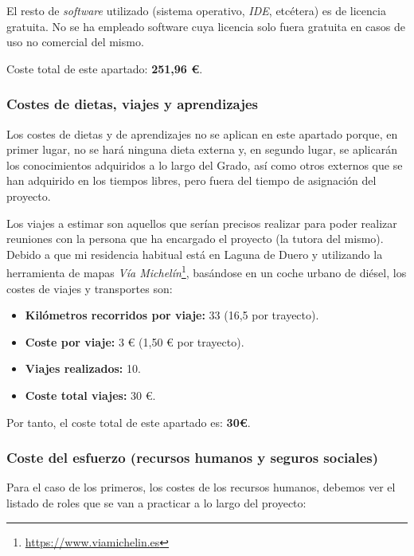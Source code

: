 \documentclass[twoside]{report}
\begin{document}
El resto de \textit{software} utilizado (sistema operativo, \textit{IDE}, etcétera) es de licencia gratuita. No se ha empleado software cuya licencia solo fuera gratuita en casos de uso no comercial del mismo.

Coste total de este apartado: \textbf{251,96 \euro}.

\subsubsection{Costes de dietas, viajes y aprendizajes}

Los costes de dietas y de aprendizajes no se aplican en este apartado porque, en primer lugar, no se hará ninguna dieta externa y, en segundo lugar, se aplicarán los conocimientos adquiridos a lo largo del Grado, así como otros externos que se han adquirido en los tiempos libres, pero fuera del tiempo de asignación del proyecto.

Los viajes a estimar son aquellos que serían precisos realizar para poder realizar reuniones con la persona que ha encargado el proyecto (la tutora del mismo). Debido a que mi residencia habitual está en Laguna de Duero y utilizando la herramienta de mapas \textit{Vía Michelín}\footnote{\url{https://www.viamichelin.es}}, basándose en un coche urbano de diésel, los costes de viajes y transportes son:

\begin{itemize}
\item \textbf{Kilómetros recorridos por viaje:} 33 (16,5 por trayecto).
\item \textbf{Coste por viaje:} 3 \euro \hspace{0.1cm} (1,50 \euro \hspace{0.1cm} por trayecto).
\item \textbf{Viajes realizados:} 10.
\item \textbf{Coste total viajes:} 30 \euro.
\end{itemize}

Por tanto, el coste total de este apartado es: \textbf{30\euro}.

\subsubsection{Coste del esfuerzo (recursos humanos y seguros sociales)}

Para el caso de los primeros, los costes de los recursos humanos, debemos ver el listado de roles que se van a practicar a lo largo del proyecto:
\end{document}
